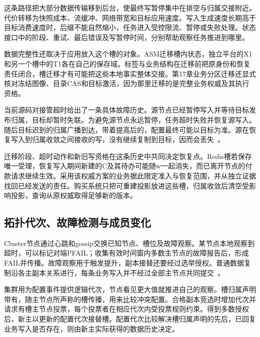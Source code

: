 
这条路径把大部分数据传输移到后台，使最终写暂停集中在排空与归属交接附近。代价转移为快照成本、流缓冲、网络带宽和目标应用速度。写入生成速度长期高于目标消费速度时，后缀不能自然缩小，任务进入受控限流、暂停或失败处理。状态接口中的阶段、重试、最后错误及写暂停时间，分别帮助观察任务推进到哪里。

数据完整性还取决于应用放入这个槽的对象。ASM迁移槽内状态，独立平台的X1和另一个槽中的T1各在自己的保存域。标签与业务结构在迁移前把原身份和恢复责任闭合，槽迁移才有可能把这些本地事实整体交接。第17章业务分区迁移还显式核对冻结图像、目录CAS和目标激活，因为那里迁移的是完整业务权威及其执行资格。

当前源码对接管超时给出了一条具体故障历史。源节点已经暂停写入并等待目标发布归属，目标却暂时失联。为避免源节点永远暂停，任务超时失败并恢复源写入。随后目标迟到的归属广播到达，带着提高后的，配置最终可能以目标为准。源在恢复写入到归属收敛之间接收的写，没有继续复制到目标，因而会丢失~\cite{redis8102-asm}。


迁移阶段、超时动作和新旧写资格在这条历史中共同决定恢复点。Redis槽若保存唯一受理，恢复写入期间新建的C及其待办可能随w一起消失，而已离开节点的付款请求继续生效。采用该权威方案的业务据此限定准入与恢复范围，并从独立证据找回已经发送的责任。购买系统只把可重建投影放进这些槽，归属收敛后清空受影响投影，查询从原权威取得足够新的版本。

\subsection{拓扑代次、故障检测与成员变化}

Cluster节点通过心跳和gossip交换已知节点、槽位及故障观察。某节点本地观察到超时，可以标记对端PFAIL；收集有效时间窗内多数主节点的故障报告后，形成FAIL并传播。故障观察用于触发提升，副本接替还要经过选举授权。普通数据复制沿各主副本关系进行，每条业务写入并不经过全部主节点共同提交~\cite{redis-cluster-spec}。

集群用为配置事件提供逻辑代次，节点看见更大值就推进自己的观察。槽归属声明带有，随主节点所声称的槽传播，用来比较冲突配置。合格副本竞选时增加代次并请求有槽主节点投票，每个投票者在相应代次内受投票规则约束。得到多数授权后，新主以更新的配置代次接替槽。配置代次比较解决槽归属声明的先后，已回复业务写入是否存在，则由新主实际获得的数据历史决定。

